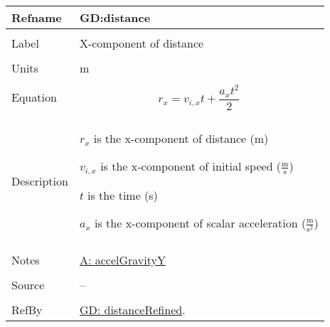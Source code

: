 \documentclass[12pt]{article}
\begin{document}
\noindent \begin{minipage}{\textwidth}
\begin{tabular}{p{} p{}}
\toprule \textbf{Refname} & \textbf{GD:distance}
\label{GD:distance}
\\ \midrule \\
Label & X-component of distance
\\ \midrule \\
Units & m
\\ \midrule \\
Equation & \begin{displaymath}
           {r_{x}}={v_{i,x}} t+\frac{{a_{x}} t^{2}}{2}
           \end{displaymath}
\\ \midrule \\
Description & \begin{symbDescription}
              \item{${r_{x}}$ is the x-component of distance (m)}
              \item{${v_{i,x}}$ is the x-component of initial speed ($\frac{\text{m}}{\text{s}}$)}
              \item{$t$ is the time (s)}
              \item{${a_{x}}$ is the x-component of scalar acceleration ($\frac{\text{m}}{\text{s}^{2}}$)}
              \end{symbDescription}
\\ \midrule \\
Notes & \hyperref[accelGravityY]{A: accelGravityY}
\\ \midrule \\
Source & --
\\ \midrule \\
RefBy & \hyperref[GD:distanceRefined]{GD: distanceRefined}.
\\ \bottomrule \end{tabular}
\end{minipage}
\par~
\end{document}
